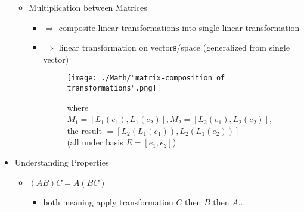 \begin{itemize}
\begin{itemize}
\begin{itemize}
		\end{itemize}
	\item Multiplication between Matrices
		\begin{itemize}
		\item $\Rightarrow$ composite linear transformation\textbf{s} into single linear transformation
		\item $\Rightarrow$ linear transformation on vector\textbf{s}/space (generalized from single vector)
		\begin{figure}[ht]
		\texttt{[image: ./Math/"matrix-composition of transformations".png]}
		\caption*{where $M_1=[L_1(e_1), L_1(e_2)], M_2=[L_2(e_1), L_2(e_2)]$, the result $=[L_2(L_1(e_1)), L_2(L_1(e_2))]$ \\ (all under basis $E=[e_1,e_2]$)}
		\end{figure}
		\end{itemize}
	\end{itemize}
	
\item Understanding Properties
	\begin{itemize}
		\item $(AB)C = A(BC)$
		\begin{itemize}
			\item both meaning apply transformation $C$ then $B$ then $A$...
		\end{itemize}
	\end{itemize}
\end{itemize}

